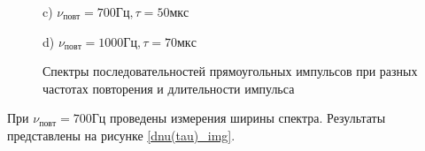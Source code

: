 \documentclass[a4paper,12pt]{article} %
\begin{document}
\begin{figure}[h!]
\begin{minipage}[h!]{0.47\linewidth}
 c) $\nu_{повт} = 700 Гц, \tau = 50 мкс$ \\
\end{minipage}
\hfill
\begin{minipage}[h!]{0.47\linewidth}
 d) $\nu_{повт} = 1000 Гц, \tau = 70 мкс$ \\
\end{minipage}
\caption{Спектры последовательностей прямоугольных импульсов при разных частотах повторения и длительности импульса}
\label{прямоуг}
\end{figure}
\newpage
При $\nu_{повт} = 700 Гц$ проведены измерения ширины спектра. Результаты 
представлены на рисунке \ref{dnu(tau)_img}.
\end{document}

